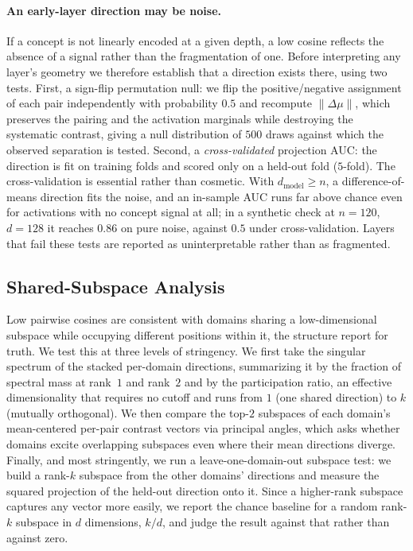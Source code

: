 \documentclass[11pt]{article}
\begin{document}
\paragraph{An early-layer direction may be noise.}
If a concept is not linearly encoded at a given depth, a low cosine reflects
the absence of a signal rather than the fragmentation of one. Before
interpreting any layer's geometry we therefore establish that a direction
exists there, using two tests. First, a sign-flip permutation null: we flip
the positive/negative assignment of each pair independently with probability
$0.5$ and recompute $\lVert\Delta\mu\rVert$, which preserves the pairing and
the activation marginals while destroying the systematic contrast, giving a
null distribution of $500$ draws against which the observed separation is
tested. Second, a \emph{cross-validated} projection AUC: the direction is fit
on training folds and scored only on a held-out fold ($5$-fold). The
cross-validation is essential rather than cosmetic. With
$d_{\text{model}} \geq n$, a difference-of-means direction fits the noise, and
an in-sample AUC runs far above chance even for activations with no concept
signal at all; in a synthetic check at $n{=}120$, $d{=}128$ it reaches $0.86$
on pure noise, against $0.5$ under cross-validation. Layers that fail these
tests are reported as uninterpretable rather than as fragmented.

\subsection{Shared-Subspace Analysis}
\label{sec:subspace}

Low pairwise cosines are consistent with domains sharing a low-dimensional
subspace while occupying different positions within it, the structure
\citet{burger2024truth} report for truth. We test this at three levels of
stringency. We first take the singular spectrum of the stacked per-domain
directions, summarizing it by the fraction of spectral mass at rank~$1$ and
rank~$2$ and by the participation ratio, an effective dimensionality that
requires no cutoff and runs from $1$ (one shared direction) to $k$ (mutually
orthogonal). We then compare the top-$2$ subspaces of each domain's
mean-centered per-pair contrast vectors via principal angles, which asks
whether domains excite overlapping subspaces even where their mean directions
diverge. Finally, and most stringently, we run a leave-one-domain-out
subspace test: we build a rank-$k$ subspace from the other domains' directions
and measure the squared projection of the held-out direction onto it. Since a
higher-rank subspace captures any vector more easily, we report the chance
baseline for a random rank-$k$ subspace in $d$ dimensions, $k/d$, and judge
the result against that rather than against zero.
\end{document}
